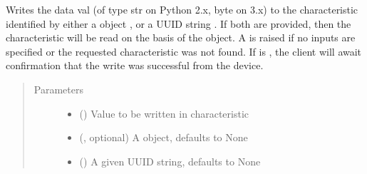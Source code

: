 \documentclass[letterpaper,10pt,english]{sphinxmanual}
\begin{document}
\begin{fulllineitems}
\begin{fulllineitems}
\begin{quote}
\begin{description}
\end{description}\end{quote}

\end{fulllineitems}


\begin{fulllineitems}
\label{\detokenize{simpleble:simpleble.SimpleBleClient.writeCharacteristic}}
Writes the data val (of type str on Python 2.x, byte on 3.x) to the characteristic identified by either a  object , or a UUID string . If both are provided, then the characteristic will be read on the basis of the  object. A  is raised if no inputs are specified or the requested characteristic was not found. If  is , the client will await confirmation that the write was successful from the device.
\begin{quote}\begin{description}
\item[{Parameters}] \leavevmode\begin{itemize}
\item {} 
 (\sphinxstyleliteralemphasis{\sphinxupquote{, }}) \textendash{} Value to be written in characteristic

\item {} 
 (, optional) \textendash{} A  object, defaults to None

\item {} 
 (\sphinxstyleliteralemphasis{\sphinxupquote{, }}) \textendash{} A given UUID string, defaults to None


\end{itemize}
\end{description}
\end{quote}
\end{fulllineitems}
\end{fulllineitems}
\end{document}
